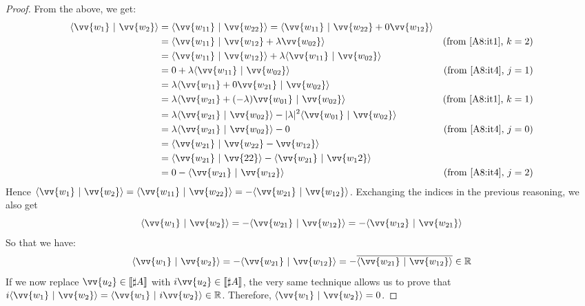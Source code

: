 \documentclass[runningheads,orivec,envcountsame,envcountsect]{llncs}
\def\R{\mathbb{R}}            %
\def\scal#1#2{\langle{#1}~|~{#2}\rangle}
\def\sem#1{\llbracket#1\rrbracket}
\begin{document}
\begin{proof}
    From the above, we get:
    \begin{align*}
        \scal{\vv{w_1}}{\vv{w_2}} &= \scal{\vv{w_{11}}}{\vv{w_{22}}} = \scal{\vv{w_{11}}}{\vv{w_{22}}+0\vv{w_{12}}} & \\
        &=\scal{\vv{w_{11}}}{\vv{w_{12}}+ \lambda\vv{w_{02}}} & (\text{from \Cref{A8:it1}, } k=2)\\
        &=\scal{\vv{w_{11}}}{\vv{w_{12}}} + \lambda \scal{\vv{w_{11}}}{\vv{w_{02}}} &\\
        &= 0 + \lambda \scal{\vv{w_{11}}}{\vv{w_{02}}} & (\text{from \Cref{A8:it4}, } j=1)\\
        &= \lambda \scal{\vv{w_{11}} + 0\vv{w_{21}}}{\vv{w_{02}}} & \\
        &= \lambda \scal{\vv{w_{21}} + (-\lambda)\vv{w_{01}}}{\vv{w_{02}}} & (\text{from \Cref{A8:it1}, } k=1)\\
        &= \lambda \scal{\vv{w_{21}}}{\vv{w_{02}}} - |\lambda|^2 \scal{\vv{w_{01}}}{\vv{w_{02}}} & \\
        &= \lambda \scal{\vv{w_{21}}}{\vv{w_{02}}} - 0 & (\text{from \Cref{A8:it4}, } j=0)\\
        &=\scal{\vv{w_{21}}}{\vv{w_{22}}- \vv{w_{12}}} & \\
        &=\scal{\vv{w_{21}}}{\vv{22}} - \scal{\vv{w_{21}}}{\vv{w_12}} & \\
        &= 0 - \scal{\vv{w_{21}}}{\vv{w_{12}}} & (\text{from \Cref{A8:it4}, } j=2)\\
    \end{align*}
    Hence $\scal{\vv{w_1}}{\vv{w_2}} = \scal{\vv{w_{11}}}{\vv{w_{22}}} = - \scal{\vv{w_{21}}}{\vv{w_{12}}}$. Exchanging the indices in the previous reasoning, we also get 
    \[
    \scal{\vv{w_1}}{\vv{w_2}}=-\scal{\vv{w_{21}}}{\vv{w_{12}}}=-\scal{\vv{w_{12}}}{\vv{w_{21}}}
    \]
    So that we have:
    \[
        \scal{\vv{w_1}}{\vv{w_2}}=-\scal{\vv{w_{21}}}{\vv{w_{12}}}=-\overline{\scal{\vv{w_{21}}}{\vv{w_{12}}}}\in\R
    \]
    If we now replace $\vv{u_2}\in\sem{\sharp A}$ with $i\vv{u_2}\in\sem{\sharp A}$, the very same technique allows us to prove that $i\scal{\vv{w_1}}{\vv{w_2}}=\scal{\vv{w_1}}{i \vv{w_2}}\in\R$. Therefore, $\scal{\vv{w_1}}{\vv{w_2}}=0$.
\end{proof}
\end{document}
